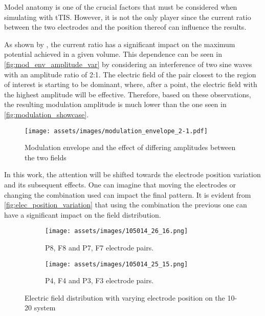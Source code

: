 Model anatomy is one of the crucial factors that must be considered when simulating with \gls{tTIS}. However, it is not the only player since the current ratio between the two electrodes and the position thereof can influence the results.

As shown by , the current ratio has a significant impact on the maximum potential achieved in a given volume. This dependence can be seen in \autoref{fig:mod_env_amplitude_var} by considering an interference of two sine waves with an amplitude ratio of 2:1. The electric field of the pair closest to the region of interest is starting to be dominant, where, after a point, the electric field with the highest amplitude will be effective. Therefore, based on these observations, the resulting modulation amplitude is much lower than the one seen in \autoref{fig:modulation_showcase}.
\begin{figure}[H]
    \centering
    \texttt{[image: assets/images/modulation\_envelope\_2-1.pdf]}
    \caption{Modulation envelope and the effect of differing amplitudes between the two fields}
    \label{fig:mod_env_amplitude_var}
\end{figure}
In this work, the attention will be shifted towards the electrode position variation and its subsequent effects. One can imagine that moving the electrodes or changing the combination used can impact the final pattern. It is evident from \autoref{fig:elec_position_variation} that using the combination  the previous one can have a significant impact on the field distribution.
\begin{figure}[H]
    \centering
    \begin{subfigure}[b]{0.49\textwidth}
        \texttt{[image: assets/images/105014\_26\_16.png]}
        \caption{P8, F8 and P7, F7 electrode pairs.}
        \label{fig:26_16_elec_pair}
    \end{subfigure}
    \begin{subfigure}[b]{0.49\textwidth}
        \texttt{[image: assets/images/105014\_25\_15.png]}
        \caption{P4, F4 and P3, F3 electrode pairs.}
        \label{fig:25_15_elec_pair}
    \end{subfigure}
    \caption{Electric field distribution with varying electrode position on the 10-20 system}
    \label{fig:elec_position_variation}
\end{figure}

